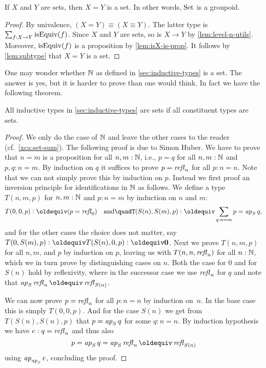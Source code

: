 \begin{lemma}\label{lem:eq_of_sets-is-set}
If $X$ and $Y$ are sets, then $X=Y$ is a set. 
In other words, $\mathord{\mathrm{Set}}$ is a groupoid.
\end{lemma}

\begin{proof}
By univalence, $(X=Y) \equiv (X\equiv Y)$. The latter type is
$\sum_{f:X\to Y} \mathrm{isEquiv}(f)$. Since $X$ and $Y$ are sets,
so is $X\to Y$ by \cref{lem:level-n-utils}. Moreover,
$\mathrm{isEquiv}(f)$ is a proposition by \cref{lem:isX-is-prop}.
It follows by \cref{lem:subtype} that $X=Y$ is a set.  
\end{proof}

One may wonder whether $\mathbb{N}$ as defined in \cref{sec:inductive-types}
is a set. The answer is yes, but it is harder to prove than one
would think. In fact we have the following theorem.

\begin{theorem}\label{thm:isset-inductive-types}
All inductive types in \cref{sec:inductive-types} are sets
if all constituent types are sets.
\end{theorem}

\begin{proof}
  We only do the case of $\mathbb{N}$ and leave the other cases to the reader
  (cf.\ \cref{xca:set-sum}). The following proof is due to Simon Huber.
  We have to prove that $n=m$ is a
  proposition for all $n,m:\mathbb{N}$, i.e., $p = q$ for all $n,m : \mathbb{N}$ and
  $p, q : n = m$.  By induction on $q$ it suffices to prove $p = \mathop{{\it refl}_{n}}$ for all $p : n = n$.  Note that we can not simply prove this by
  induction on $p$.  Instead we first proof an inversion principle for
  identifications in $\mathbb{N}$ as follows.  We define a type $T(n,m,p)$
  for $n, m : \mathbb{N}$ and $p : n = m$ by induction on $n$ and $m$:
  \[
    T(0,0,p) \defeq (p = \refl{0})%
    \quad \text{and} \quad%
    T(S(n), S(m), p) \defeq \sum_{q : n = m} p = \ap S q,%
  \]
  and for the other cases the choice does not matter, say $T(0, S(m),
  p) \defeq T(S(n), 0 ,p) \defeq \bn{0}$.  Next we prove $T(n,m,p)$
  for all $n,m$, and $p$ by induction on $p$, leaving us with
  $T(n,n,\mathop{{\it refl}_{n}})$ for all $n : \mathbb{N}$, which we in turn prove by
  distinguishing cases on $n$.  Both the case for $0$ and for $S(n)$
  hold by reflexivity, where in the successor case we use $\mathop{{\it refl}_{n}}$
  for $q$ and note that $\ap S \refl{n} \jdeq \refl{S(n)}$.

  We can now prove $p = \mathop{{\it refl}_{n}}$ for all $p : n = n$ by induction
  on~$n$.  In the base case this is simply $T(0,0,p)$.  And for the
  case $S(n)$ we get from $T(S(n),S(n),p)$ that $p = \mathop{{\it ap}_{S}} q$ for
  some $q : n = n$.  By induction hypothesis we have $e : q =
  \mathop{{\it refl}_{n}}$ and thus also
  \[
    p = \ap{S} q = \ap{S} \refl{n} \jdeq \refl{S (n)}
  \]
  using $\mathop{{\it ap}_{\mathop{{\it ap}_{S}}}} e$, concluding the proof.
\end{proof}

